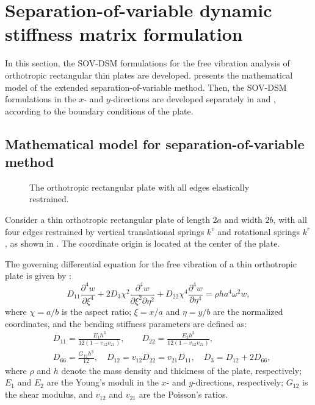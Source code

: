 \documentclass[preprint,12pt,number]{elsarticle}
\begin{document}
\FloatBarrier
\section{Separation-of-variable dynamic stiffness matrix formulation}\label{sec:SOV-DSM}
In this section, the SOV-DSM formulations for the free vibration analysis of orthotropic rectangular thin plates are developed.  
 presents the mathematical model of the extended separation-of-variable method.  
Then, the SOV-DSM formulations in the $x$- and $y$-directions are developed separately in  and , according to the boundary conditions of the plate.

\subsection{Mathematical model for separation-of-variable method}\label{sec:Mathematical model}
\begin{figure}[!htbp]
\centering
\resizebox{0.8\textwidth}{!}
{
	
}
\caption{\small The orthotropic rectangular plate with all edges elastically restrained.} 
\label{fig:platemode}
\end{figure}
Consider a thin orthotropic rectangular plate of length $2a$ and width $2b$, with all four edges restrained by vertical translational springs $k^v$ and rotational springs $k^r$, as shown in . 
The coordinate origin is located at the center of the plate.

The governing differential equation for the free vibration of a thin orthotropic plate is given by \citep{xing2020improved}:  
%
\begin{equation}\label{eq:governing_EOM}
D_{11}\frac{\partial^4w}{\partial \xi^4} + 2D_3\chi^2\frac{\partial^4w}{\partial \xi^2 \partial \eta^2} + D_{22}\chi^4\frac{\partial^4w}{\partial \eta^4} = \rho ha^4\omega^2w,
\end{equation}
%
where $ \chi = a / b $ is the aspect ratio; $ \xi = x / a $ and $ \eta = y / b $ are the normalized coordinates, and the bending stiffness parameters are defined as:
%
\begin{equation}\label{eq:bd_stiff}
\begin{split}
	&D_{11} = \frac{E_1h^3}{12(1-v_{12}v_{21})}, \qquad D_{22} = \frac{E_2h^3}{12(1-v_{12}v_{21})}, \\  
	&D_{66} = \frac{G_{12}h^3}{12}, \quad D_{12} = v_{12}D_{22} = v_{21}D_{11}, \quad D_3 = D_{12} + 2D_{66},
\end{split}
\end{equation}
%
where $\rho$ and $h$ denote the mass density and thickness of the plate, respectively; $E_1$ and $E_2$ are the Young’s moduli in the $x$- and $y$-directions, respectively; $G_{12}$ is the shear modulus, and $v_{12}$ and $v_{21}$ are the Poisson’s ratios.
\end{document}
